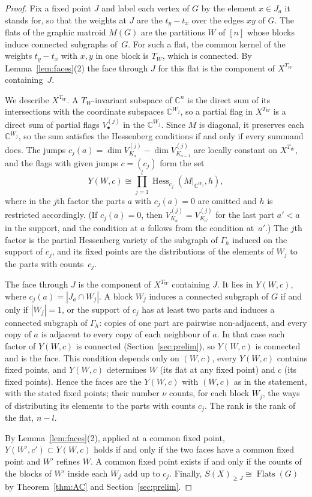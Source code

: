 \documentclass[11pt,a4paper]{article}
\numberwithin{equation}{section}
\theoremstyle{plain}
\theoremstyle{definition}
\theoremstyle{remark}
\newcommand{\C}{\mathbb{C}}
\DeclareMathOperator{\Hess}{Hess}
\DeclareMathOperator{\Flats}{Flats}
\begin{document}
\begin{proof}
Fix a fixed point $J$ and label each vertex of $G$ by the element $x\in J_a$ it stands for, so that the weights at $J$ are the $t_y-t_x$ over the edges $xy$ of $G$. The flats of the graphic matroid $M(G)$ are the partitions $W$ of $[n]$ whose blocks induce connected subgraphs of~$G$. For such a flat, the common kernel of the weights $t_y-t_x$ with $x,y$ in one block is $T_W$, which is connected. By Lemma~\ref{lem:faces}(2) the face through $J$ for this flat is the component of $X^{T_W}$ containing~$J$.

We describe $X^{T_W}$. A $T_W$-invariant subspace of $\C^n$ is the direct sum of its intersections with the coordinate subspaces $\C^{W_j}$, so a partial flag in $X^{T_W}$ is a direct sum of partial flags $V^{(j)}_\bullet$ in the $\C^{W_j}$. Since $M$ is diagonal, it preserves each $\C^{W_j}$, so the sum satisfies the Hessenberg conditions if and only if every summand does. The jumps $c_j(a)=\dim V^{(j)}_{K_a}-\dim V^{(j)}_{K_{a-1}}$ are locally constant on $X^{T_W}$, and the flags with given jumps $c=(c_j)$ form the set
\[
Y(W,c)\cong\prod_{j=1}^l\Hess_{c_j}(M|_{\C^{W_j}},h),
\]
where in the $j$th factor the parts $a$ with $c_j(a)=0$ are omitted and $h$ is restricted accordingly. (If $c_j(a)=0$, then $V^{(j)}_{K_a}=V^{(j)}_{K_{a'}}$ for the last part $a'<a$ in the support, and the condition at $a$ follows from the condition at~$a'$.) The $j$th factor is the partial Hessenberg variety of the subgraph of $\Gamma_h$ induced on the support of $c_j$, and its fixed points are the distributions of the elements of $W_j$ to the parts with counts~$c_j$.

The face through $J$ is the component of $X^{T_W}$ containing $J$. It lies in $Y(W,c)$, where $c_j(a)=|J_a\cap W_j|$. A block $W_j$ induces a connected subgraph of $G$ if and only if $|W_j|=1$, or the support of $c_j$ has at least two parts and induces a connected subgraph of $\Gamma_h$: copies of one part are pairwise non-adjacent, and every copy of $a$ is adjacent to every copy of each neighbour of $a$. In that case each factor of $Y(W,c)$ is connected (Section~\ref{sec:prelim}), so $Y(W,c)$ is connected and is the face. This condition depends only on $(W,c)$, every $Y(W,c)$ contains fixed points, and $Y(W,c)$ determines $W$ (its flat at any fixed point) and $c$ (its fixed points). Hence the faces are the $Y(W,c)$ with $(W,c)$ as in the statement, with the stated fixed points; their number $\nu$ counts, for each block $W_j$, the ways of distributing its elements to the parts with counts $c_j$. The rank is the rank of the flat, $n-l$.

By Lemma~\ref{lem:faces}(2), applied at a common fixed point, $Y(W',c')\subset Y(W,c)$ holds if and only if the two faces have a common fixed point and $W'$ refines $W$. A common fixed point exists if and only if the counts of the blocks of $W'$ inside each $W_j$ add up to $c_j$. Finally, $S(X)_{\geqslant J}\cong\Flats(G)$ by Theorem~\ref{thm:AC} and Section~\ref{sec:prelim}.
\end{proof}
\end{document}
